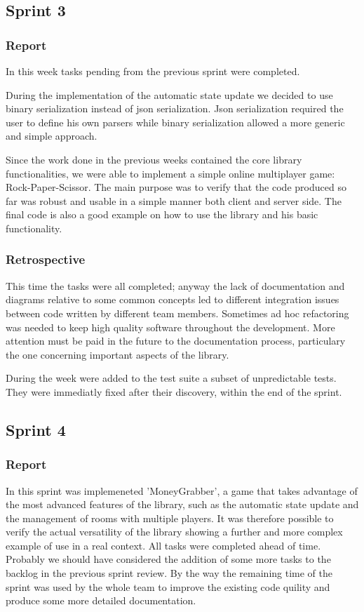 \subsection{Sprint 3}
\subsubsection{Report}

In this week tasks pending from the previous sprint were completed.

During the implementation of the automatic state update we decided to use binary serialization instead of json serialization. Json serialization required the user to define his own parsers while binary serialization allowed a more generic and simple approach.

Since the work done in the previous weeks contained the core library functionalities, we were able to implement a simple online multiplayer game:  Rock-Paper-Scissor. 
The main purpose was to verify that the code produced so far was robust and usable in a simple manner both client and server side.
The final code is also a good example on how to use the library and his basic functionality.


\subsubsection{Retrospective}
This time the tasks were all completed; anyway the lack of documentation and diagrams relative to some common concepts led to different integration issues between code written by different team members. Sometimes ad hoc refactoring was needed to keep high quality software throughout the development.
More attention must be paid in the future to the documentation process, particulary the one concerning important aspects of the library. 

During the week were added to the test suite a subset of unpredictable tests.
They were immediatly fixed after their discovery, within the end of the sprint.




\subsection{Sprint 4}
\subsubsection{Report}
In this sprint was implemeneted 'MoneyGrabber', a game that takes advantage of the most advanced features of the library, such as the automatic state update and the management of rooms with multiple players.
It was therefore possible to verify the actual versatility of the library showing a further and more complex example of use in a real context.
All tasks were completed ahead of time.
Probably we should have considered the addition of some more tasks to the backlog in the previous sprint review. By the way the remaining time of the sprint was used by the whole team to improve the existing code quility and produce some more detailed documentation.



